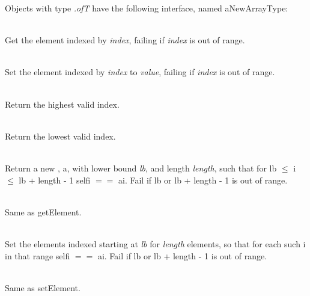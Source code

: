 \noindent Objects with type {\it {}.of\/\LB{}T\/\RB{}} have the
following interface, named aNewArrayType: 

\begin{desc}
  \item[\kw{function}  getElement\/\LB{}index \CO{} \tn{Integer}\/\RB{} \returns{} \/\LB{}T\/\RB{}]~\\
    Get the element indexed by {\it index}, failing if {\it index} is out of range.
  \item[\kw{operation} setElement\/\LB{}index \CO \tn{Integer}, value \CO T\/\RB{}]~\\
    Set the element indexed by {\it index} to {\it value}, failing if {\it index} is out of range.
  \item[\kw{function}  upperbound \returns{} \/\LB{}\tn{Integer}\/\RB{}]~\\
    Return the highest valid index.
  \item[\kw{function}  lowerbound \returns{} \/\LB{}\tn{Integer}\/\RB{}]~\\
    Return the lowest valid index.
  \item[\kw{function}  getElement\/\LB{}lb \CO{} \tn{Integer}, length \CO{} \tn{Integer}\/\RB{} \returns{} \/\LB{}aNewArrayType\/\RB{}]~\\
    Return a new , a, with lower bound {\it lb}, and length {\it length}, such that for lb $\leq$ i $\leq$ lb + length - 1\CO{} self\LB{}i\/\RB{} $==$ a\LB{}i\/\RB{}.
    Fail if lb or lb + length - 1 is out of range.
  \item[\kw{function}  getSlice\/\LB{}lb \CO \tn{Integer}, length \CO \tn{Integer}\/\RB{} \returns{} \/\LB{}aNewArrayType\/\RB{}]~\\
    Same as getElement.
  \item[\kw{operation} setElement\/\LB{}lb \CO{} \tn{Integer}, length \CO{}
  \tn{Integer}, a \CO{} RIS\/\RB{}]~\\
    Set the elements indexed starting at {\it lb} for {\it length} elements,
    so that for each such i in that range\CO{}
    self\/\LB{}i\/\RB{} $==$ a\/\LB{}i\/\RB{}. Fail if
    lb or lb + length - 1 is out of range. 
  \item[\kw{operation} setSlice\/\LB{}lb \CO{} \tn{Integer}, length \CO{}
  \tn{Integer}, a \CO{} Sequence.of\/\LB{}T\/\RB{}\/\RB{}]~\\
    Same as setElement.
  \item[\kw{operation} slideTo\/\LB{}newlb \CO{} \tn{Integer}\/\RB{}]~\\

\end{desc}
